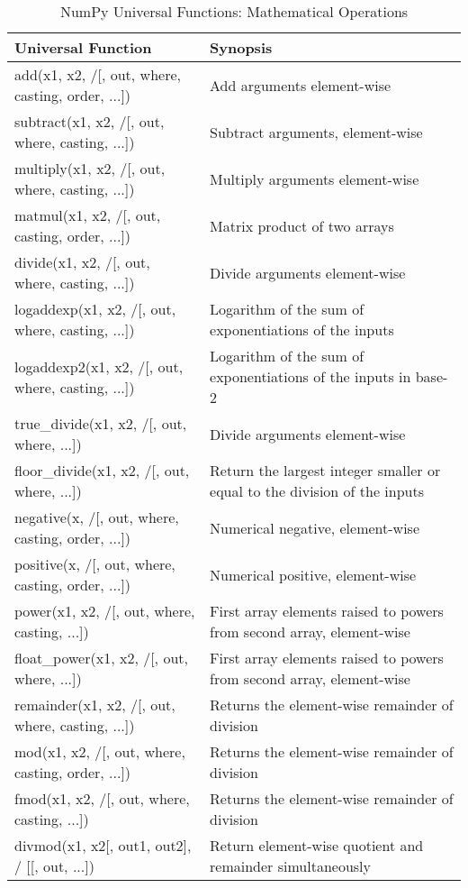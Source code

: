 \documentclass[a4paper,11pt]{book}
\numberwithin{figure}{chapter}
\numberwithin{table}{chapter}
\begin{document}
\begin{appendices}
\begin{table}[!htbp]
\caption{NumPy Universal Functions: Mathematical Operations}
\label{tab:numpy_math_ufuncs}
\centering
\begin{tabular}{lp{8.5cm}}
\toprule \toprule 
Universal Function & Synopsis \\
\midrule
add(x1, x2, /[, out, where, casting, order, ...])
& Add arguments element-wise\\
subtract(x1, x2, /[, out, where, casting, ...])
& Subtract arguments, element-wise\\
multiply(x1, x2, /[, out, where, casting, ...])
& Multiply arguments element-wise\\
matmul(x1, x2, /[, out, casting, order, ...])
& Matrix product of two arrays\\
divide(x1, x2, /[, out, where, casting, ...])
& Divide arguments element-wise\\
logaddexp(x1, x2, /[, out, where, casting, ...])
& Logarithm of the sum of exponentiations of the inputs\\
logaddexp2(x1, x2, /[, out, where, casting, ...])
& Logarithm of the sum of exponentiations of the inputs in base-2\\
true_divide(x1, x2, /[, out, where, ...])
& Divide arguments element-wise\\
floor_divide(x1, x2, /[, out, where, ...])
& Return the largest integer smaller or equal to the division of the inputs\\
negative(x, /[, out, where, casting, order, ...])
& Numerical negative, element-wise\\
positive(x, /[, out, where, casting, order, ...])
& Numerical positive, element-wise\\
power(x1, x2, /[, out, where, casting, ...])
& First array elements raised to powers from second array, element-wise\\
float_power(x1, x2, /[, out, where, ...])
& First array elements raised to powers from second array, element-wise\\
remainder(x1, x2, /[, out, where, casting, ...])
& Returns the element-wise remainder of division\\
mod(x1, x2, /[, out, where, casting, order, ...])
& Returns the element-wise remainder of division\\
fmod(x1, x2, /[, out, where, casting, ...])
& Returns the element-wise remainder of division\\
divmod(x1, x2[, out1, out2], / [[, out, ...])
& Return element-wise quotient and remainder simultaneously\\

\end{tabular}
\end{table}
\end{appendices}
\end{document}
